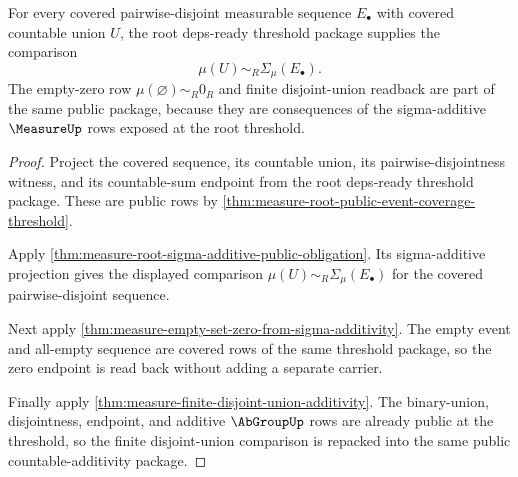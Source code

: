 \begin{theorem}
\label{thm:measure-root-public-countable-additivity-threshold}
For every covered pairwise-disjoint measurable sequence $E_\bullet$ with
covered countable union $U$, the root deps-ready threshold package supplies
the comparison
$$
\mu(U)\sim_R\Sigma_\mu(E_\bullet).
$$
The empty-zero row $\mu(\varnothing)\sim_R0_R$ and finite disjoint-union
readback are part of the same public package, because they are consequences
of the sigma-additive $\MeasureUp$ rows exposed at the root threshold.
\end{theorem}
\begin{proof}
Project the covered sequence, its countable union, its pairwise-disjointness
witness, and its countable-sum endpoint from the root deps-ready threshold
package. These are public rows by
\autoref{thm:measure-root-public-event-coverage-threshold}.

Apply \autoref{thm:measure-root-sigma-additive-public-obligation}. Its
sigma-additive projection gives the displayed comparison
$\mu(U)\sim_R\Sigma_\mu(E_\bullet)$ for the covered pairwise-disjoint
sequence.

Next apply \autoref{thm:measure-empty-set-zero-from-sigma-additivity}. The
empty event and all-empty sequence are covered rows of the same threshold
package, so the zero endpoint is read back without adding a separate carrier.

Finally apply \autoref{thm:measure-finite-disjoint-union-additivity}. The
binary-union, disjointness, endpoint, and additive $\AbGroupUp$ rows are
already public at the threshold, so the finite disjoint-union comparison is
repacked into the same public countable-additivity package.
\end{proof}

